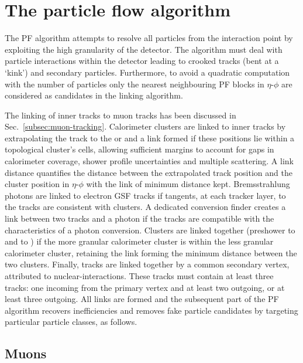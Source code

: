 \section{The particle flow algorithm}

The PF algorithm attempts to resolve all particles from the interaction point by exploiting the high granularity of the \CMS detector. The algorithm must deal with particle interactions within the detector leading to crooked tracks (bent at a `kink') and secondary particles. Furthermore, to avoid a quadratic computation with the number of particles only the nearest neighbouring PF blocks in $\eta$-$\phi$ are considered as candidates in the linking algorithm.

The linking of inner tracks to muon tracks has been discussed in {Sec.~\ref{subsec:muon-tracking}}. Calorimeter clusters are linked to inner tracks by extrapolating the track to the \ECAL or \HCAL and a link formed if these positions lie within a topological cluster's cells, allowing sufficient margins to account for gaps in calorimeter coverage, shower profile uncertainties and multiple scattering. A link distance quantifies the distance between the extrapolated track position and the cluster position in $\eta$-$\phi$ with the link of minimum distance kept. Bremsstrahlung photons are linked to electron GSF tracks if tangents, at each tracker layer, to the tracks are consistent with \ECAL clusters. A dedicated conversion finder creates a link between two tracks and a photon if the tracks are compatible with the characteristics of a photon conversion. Clusters are linked together (preshower to \ECAL and \ECAL to \HCAL) if the more granular calorimeter cluster is within the less granular calorimeter cluster, retaining the link forming the minimum distance between the two clusters. Finally, tracks are linked together by a common secondary vertex, attributed to nuclear-interactions. These tracks must contain at least three tracks: one incoming from the primary vertex and at least two outgoing, or at least three outgoing. All links are formed and the subsequent part of the PF algorithm recovers inefficiencies and removes fake particle candidates by targeting particular particle classes, as follows.


\subsection{Muons}

